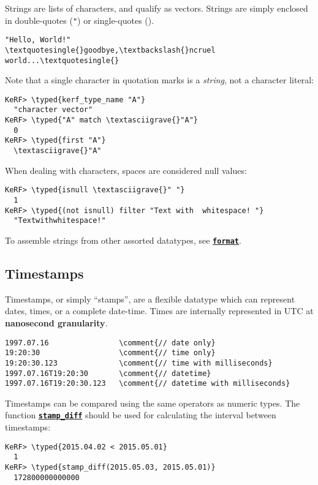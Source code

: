 \documentclass{article}
\newcommand{\typed}[1]{\textcolor{TealBlue}{#1}}
\newcommand{\comment}[1]{\textcolor{Orange}{#1}}
\newcommand{\primu}[2]{\hyperref[prim:#2]{\textbf{\texttt{#1}}}}
\newcommand{\prim}[1]{\primu{#1}{#1}}
\begin{document}
Strings are lists of characters, and qualify as vectors. Strings are simply enclosed in double-quotes (\texttt{"}) or single-quotes (\texttt{\textquotesingle}).
\begin{Verbatim}
"Hello, World!"
\textquotesingle{}goodbye,\textbackslash{}ncruel world...\textquotesingle{}
\end{Verbatim}

Note that a single character in quotation marks is a \emph{string}, not a character literal:
\begin{Verbatim}
KeRF> \typed{kerf_type_name "A"}
  "character vector"
KeRF> \typed{"A" match \textasciigrave{}"A"}
  0
KeRF> \typed{first "A"}
  \textasciigrave{}"A"
\end{Verbatim}

When dealing with characters, spaces are considered null values:
\begin{Verbatim}
KeRF> \typed{isnull \textasciigrave{}" "}
  1
KeRF> \typed{(not isnull) filter "Text with  whitespace! "}
  "Textwithwhitespace!"
\end{Verbatim}

To assemble strings from other assorted datatypes, see \prim{format}.

\pagebreak
\subsection{Timestamps}
Timestamps, or simply ``stamps'', are a flexible datatype which can represent dates, times, or a complete date-time. Times are internally represented in UTC at \textbf{nanosecond granularity}.
\begin{Verbatim}
1997.07.16                \comment{// date only}
19:20:30                  \comment{// time only}
19:20:30.123              \comment{// time with milliseconds}
1997.07.16T19:20:30       \comment{// datetime}
1997.07.16T19:20:30.123   \comment{// datetime with milliseconds}
\end{Verbatim}
Timestamps can be compared using the same operators as numeric types. The function \primu{stamp\_diff}{stampDiff} should be used for calculating the interval between timestamps:
\begin{Verbatim}
KeRF> \typed{2015.04.02 < 2015.05.01}
  1
KeRF> \typed{stamp_diff(2015.05.03, 2015.05.01)}
  172800000000000
\end{Verbatim}
\end{document}
